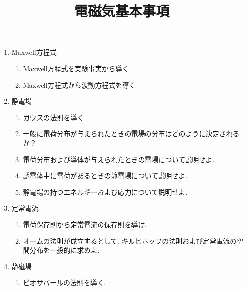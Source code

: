 \documentclass[11pt,a4paper]{jarticle}
\title{電磁気基本事項}
\author{}
\date{}
\begin{document}
\maketitle
\begin{enumerate}
    \item Maxwell方程式
    \begin{enumerate}
        \item Maxwell方程式を実験事実から導く.
        \item Maxwell方程式から波動方程式を導く
    \end{enumerate}
    \item 静電場
    \begin{enumerate}
        \item ガウスの法則を導く.
        \item 一般に電荷分布が与えられたときの電場の分布はどのように決定されるか？
        \item 電荷分布および導体が与えられたときの電場について説明せよ.
        \item 誘電体中に電荷があるときの静電場について説明せよ.
        \item 静電場の持つエネルギーおよび応力について説明せよ.
    \end{enumerate}
    \item 定常電流
    \begin{enumerate}
        \item 電荷保存則から定常電流の保存則を導け.
        \item オームの法則が成立するとして, キルヒホッフの法則および定常電流の空間分布を一般的に求めよ.
    \end{enumerate}
    \item 静磁場
    \begin{enumerate}
        \item ビオサバールの法則を導く.
    \end{enumerate}
\end{enumerate}
\end{document}

